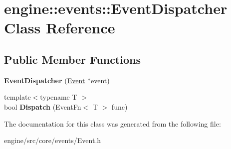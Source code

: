\hypertarget{classengine_1_1events_1_1EventDispatcher}{}\section{engine\+:\+:events\+:\+:Event\+Dispatcher Class Reference}
\label{classengine_1_1events_1_1EventDispatcher}
\subsection*{Public Member Functions}
\begin{DoxyCompactItemize}
\item 
\mbox{\label{classengine_1_1events_1_1EventDispatcher_a1a599ea2862fbf8ccff7510b3d1356f0}} 
{\bfseries Event\+Dispatcher} (\hyperlink{classengine_1_1events_1_1Event}{Event} $\ast$event)
\item 
\mbox{\label{classengine_1_1events_1_1EventDispatcher_a33900734f1a360056938b1e4566de002}} 
{\footnotesize template$<$typename T $>$ }\\bool {\bfseries Dispatch} (Event\+Fn$<$ T $>$ func)
\end{DoxyCompactItemize}


The documentation for this class was generated from the following file\+:\begin{DoxyCompactItemize}
\item 
engine/src/core/events/Event.\+h\end{DoxyCompactItemize}
